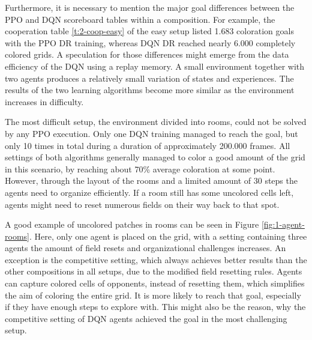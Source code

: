 Furthermore, it is necessary to mention the major goal differences between the PPO and DQN scoreboard tables within a composition. For example, the cooperation table \ref{t:2-coop-easy} of the easy setup listed 1.683 coloration goals with the PPO DR training, whereas DQN DR reached nearly 6.000 completely colored grids. A speculation for those differences might emerge from the data efficiency of the DQN using a replay memory. A small environment together with two agents produces a relatively small variation of states and experiences. The results of the two learning algorithms become more similar as the environment increases in difficulty. 

The most difficult setup, the environment divided into rooms, could not be solved by any PPO execution. Only one DQN training managed to reach the goal, but only 10 times in total during a duration of approximately 200.000 frames. All settings of both algorithms generally managed to color a good amount of the grid in this scenario, by reaching about 70\% average coloration at some point. However, through the layout of the rooms and a limited amount of 30 steps the agents need to organize efficiently. If a room still has some uncolored cells left, agents might need to reset numerous fields on their way back to that spot. 

A good example of uncolored patches in rooms can be seen in Figure \ref{fig:1-agent-rooms}. Here, only one agent is placed on the grid, with a setting containing three agents the amount of field resets and organizational challenges increases. An exception is the competitive setting, which always achieves better results than the other compositions in all setups, due to the modified field resetting rules. Agents can capture colored cells of opponents, instead of resetting them, which simplifies the aim of coloring the entire grid. It is more likely to reach that goal, especially if they have enough steps to explore with. This might also be the reason, why the competitive setting of DQN agents achieved the goal in the most challenging setup. 